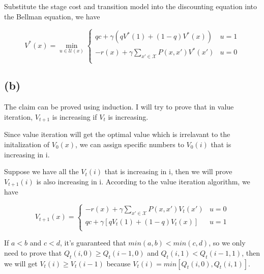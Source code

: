\documentclass{article} %
\begin{document}
Substitute the stage cost and transition model into the discounting equation into the Bellman equation, we have

$$ V^{*}(x) = \min _{u \in \mathcal{U}(x)} 
\begin{cases}
    qc + \gamma(qV^*(1) + (1-q)V^*(x)) & u=1\\
    -r(x) + \gamma \sum_{x'\in\mathcal{X}}P(x, x')V^*(x') & u=0 \\
\end{cases}
$$

\subsection{(b)}

The claim can be proved using induction. I will try to prove that in value iteration, $V_{t+1}$ is increasing if $V_t$ is increasing.

Since value iteration will get the optimal value which is irrelavant to the initalization of $V_0(x)$, we can assign specific numbers to $V_0(i)$ that is increasing in i.

Suppose we have all the $V_t(i)$ that is increasing in i, then we will prove $V_{t+1}(i)$ is also increasing in i. According to the value iteration algorithm, we have

$$V_{t+1}(x) =
\begin{cases}
    -r(x) + \gamma \sum_{x'\in\mathcal{X}}P(x, x')V_t(x') & u=0 \\
    qc + \gamma [qV_t(1) + (1-q)V_t(x)] & u=1 \\
\end{cases}$$

If $a < b$ and $c < d$, it's guaranteed that $min(a,b) < min(c,d)$, so we only need to prove that $Q_t(i, 0) \ge Q_t(i-1, 0)$ and $Q_t(i, 1) < Q_t(i - 1, 1)$, then we will get $V_t(i) \ge V_t(i - 1)$ because $V_t(i) = min[Q_t(i, 0), Q_t(i, 1)]$.
\end{document}
